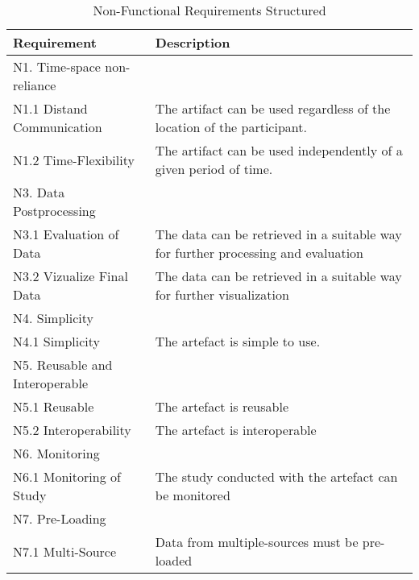 \begin{table}[htbp]
    \centering
    \begin{tabular}{L{0.35\textwidth}L{0.59\textwidth}}
    \hline
Requirement                             & Description \\ \hline
    N1. Time-space non-reliance     &             \\ \hline
    N1.1 Distand Communication      & The artifact can be used regardless of the location of the participant.            \\
    N1.2 Time-Flexibility           & The artifact can be used independently of a given period of time.            \\ \hline
    N3. Data Postprocessing &             \\ \hline
    N3.1 Evaluation of Data         & The data can be retrieved in a suitable way for further processing and evaluation            \\
    N3.2 Vizualize Final Data       & The data can be retrieved in a suitable way for further visualization             \\ \hline
    N4. Simplicity                  &            \\ \hline
    N4.1 Simplicity                 & The artefact is simple to use.           \\ \hline
    N5. Reusable and Interoperable  &             \\ \hline
    N5.1 Reusable                   & The artefact is reusable            \\
    N5.2 Interoperability           & The artefact is interoperable            \\ \hline
    N6. Monitoring                  &             \\ \hline
    N6.1 Monitoring of Study        & The study conducted with the artefact can be monitored            \\ \hline
    N7. Pre-Loading                 &             \\ \hline
    N7.1 Multi-Source             & Data from multiple-sources must be pre-loaded            \\ \hline
    \end{tabular}
    \caption[Non-Functional Requirements Structured]{Non-Functional Requirements Structured}\label{tab:NonFuncRequirementsCat}
    \end{table}


